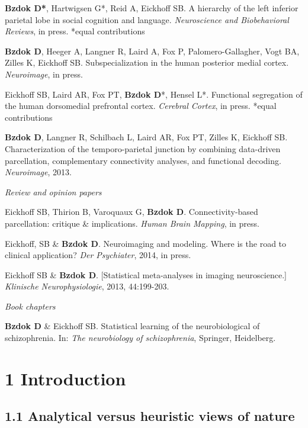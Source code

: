 \documentclass[authoryear,review,3p]{elsarticle}
\begin{document}
\textbf{Bzdok D*}, Hartwigsen G*, Reid A, Eickhoff SB.
A hierarchy of the left inferior parietal lobe in social cognition and
language.
\textit{Neuroscience and Biobehavioral Reviews}, in press. *equal contributions

\textbf{Bzdok D}, Heeger A, Langner R, Laird A, Fox P, Palomero-Gallagher,
Vogt BA, Zilles K, Eickhoff SB.
Subspecialization in the human posterior medial cortex.
\textit{Neuroimage}, in press.

Eickhoff SB, Laird AR, Fox PT, \textbf{Bzdok D}*, Hensel L*.
Functional segregation of the human dorsomedial prefrontal cortex.
\textit{Cerebral Cortex}, in press. *equal contributions

\textbf{Bzdok D}, Langner R, Schilbach L, Laird AR, Fox PT, Zilles K, Eickhoff SB.
Characterization of the temporo-parietal junction by combining data-driven
parcellation, complementary connectivity analyses, and functional decoding.
\textit{Neuroimage}, 2013.

\bigskip
\textit{Review and opinion papers}

Eickhoff SB, Thirion B, Varoquaux G, \textbf{Bzdok D}.
Connectivity-based parcellation: critique \& implications.
\textit{Human Brain Mapping}, in press.

Eickhoff, SB \& \textbf{Bzdok D}.
Neuroimaging and modeling. Where is the road to clinical application?
\textit{Der Psychiater}, 2014, in press. 

Eickhoff SB \& \textbf{Bzdok D}.
[Statistical meta-analyses in imaging neuroscience.]
\textit{Klinische Neurophysiologie}, 2013, 44:199-203.

\bigskip
\textit{Book chapters}

\linebreak
\textbf{Bzdok D} \& Eickhoff SB.
Statistical learning of the neurobiological of schizophrenia.
In: \textit{The neurobiology of schizophrenia}, Springer, Heidelberg.

\newpage

\section*{1 Introduction}

\subsection*{1.1 Analytical versus heuristic views of nature}
\end{document}
